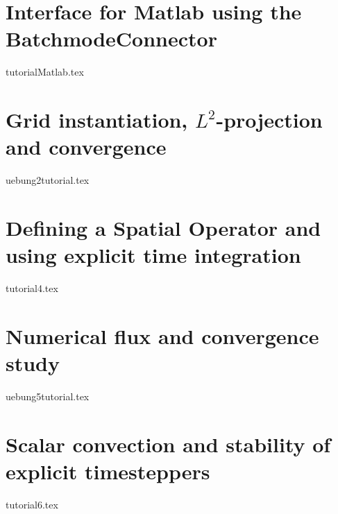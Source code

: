 \documentclass[a4paper,10pt]{report} %
\begin{document}
\chapter{Interface for Matlab using the BatchmodeConnector}
\label{Matlab}
{tutorialMatlab.tex}

\chapter{Grid instantiation, $L^2$-projection and convergence}
\label{GridInstantiation}
{uebung2tutorial.tex}


\chapter{Defining a Spatial Operator and using explicit time integration}
\label{SpatialOperator}
{tutorial4.tex}


\chapter{Numerical flux and convergence study}
\label{NumFlux}
{uebung5tutorial.tex}


\chapter{Scalar convection and stability of explicit timesteppers}
\label{ScalarAdvection}
{tutorial6.tex}

\end{document}
